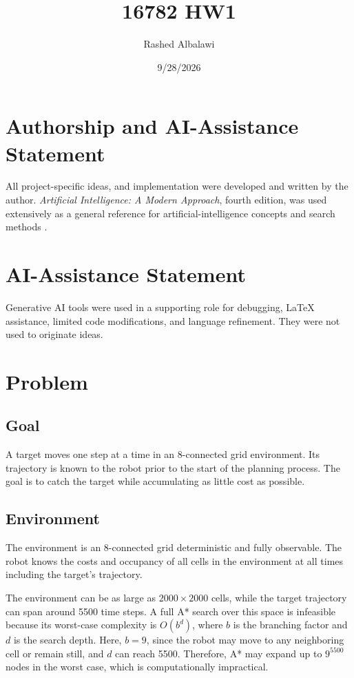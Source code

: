 \documentclass[11pt]{article}
\title{16782 HW1}
\author{Rashed Albalawi}
\date{9/28/2026}
\begin{document}
\maketitle

\section*{Authorship and AI-Assistance Statement}

All project-specific ideas, and implementation
were developed and written by the author. \emph{Artificial Intelligence: A Modern
Approach}, fourth edition, was used extensively as a general reference for
artificial-intelligence concepts and search methods \cite{russell2020aima}.


\section*{ AI-Assistance Statement}
Generative AI tools were used in a supporting role for debugging, LaTeX
assistance, limited code modifications, and language refinement. They were not used to originate ideas.

\clearpage
\tableofcontents

\clearpage
\section{Problem}
\subsection{Goal}
A target moves one step at a time in an 8-connected grid environment. Its trajectory is known to the robot prior to the start of the planning process. The goal is to catch the target while accumulating as little cost as possible.

\subsection{Environment}
The environment is an 8-connected grid deterministic and fully observable. The robot knows the costs and occupancy of all cells in the environment at all times including the target's trajectory.

The environment can be as large as \(2000 \times 2000\) cells, while the target trajectory can span around 5500 time steps. A full A* search over this space is infeasible because its worst-case complexity is \(O(b^d)\), where \(b\) is the branching factor and \(d\) is the search depth. Here, \(b=9\), since the robot may move to any neighboring cell or remain still, and \(d\) can reach 5500. Therefore, A* may expand up to \(9^{5500}\) nodes in the worst case, which is computationally impractical.
\end{document}
